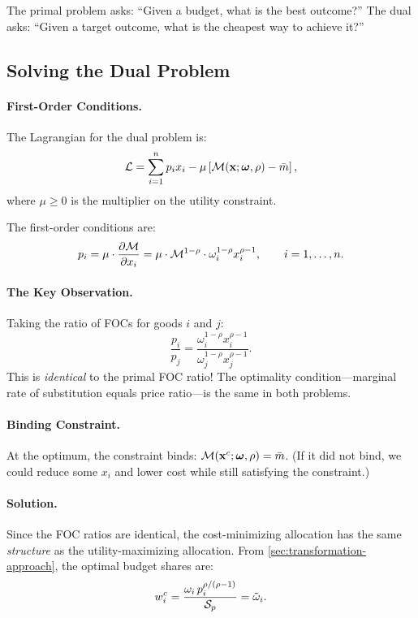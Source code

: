 The primal problem asks: ``Given a budget, what is the best outcome?'' The dual asks: ``Given a target outcome, what is the cheapest way to achieve it?''

\subsection{Solving the Dual Problem}
\label{subsec:dual-solution}

\paragraph{First-Order Conditions.}
The Lagrangian for the dual problem is:
\begin{equation}
\mathcal{L} = \sum_{i=1}^{n} p_i x_i - \mu \left[ \mathcal{M}(\mathbf{x}; \boldsymbol{\omega}, \rho) - \bar{m} \right],
\end{equation}
where $\mu \geq 0$ is the multiplier on the utility constraint.

The first-order conditions are:
\begin{equation}
\label{eq:dual-foc}
p_i = \mu \cdot \frac{\partial \mathcal{M}}{\partial x_i} = \mu \cdot \mathcal{M}^{1-\rho} \cdot \omega_i^{1-\rho} x_i^{\rho-1}, \qquad i = 1, \ldots, n.
\end{equation}

\paragraph{The Key Observation.}
Taking the ratio of FOCs for goods $i$ and $j$:
\begin{equation}
\frac{p_i}{p_j} = \frac{\omega_i^{1-\rho} x_i^{\rho-1}}{\omega_j^{1-\rho} x_j^{\rho-1}}.
\end{equation}
This is \emph{identical} to the primal FOC ratio! The optimality condition---marginal rate of substitution equals price ratio---is the same in both problems.

\paragraph{Binding Constraint.}
At the optimum, the constraint binds: $\mathcal{M}(\mathbf{x}^c; \boldsymbol{\omega}, \rho) = \bar{m}$. (If it did not bind, we could reduce some $x_i$ and lower cost while still satisfying the constraint.)

\paragraph{Solution.}
Since the FOC ratios are identical, the cost-minimizing allocation has the same \emph{structure} as the utility-maximizing allocation. From \cref{sec:transformation-approach}, the optimal budget shares are:
\begin{equation}
w_i^c = \frac{\omega_i \, p_i^{\rho/(\rho-1)}}{\mathcal{S}_p} = \tilde{\omega}_i.
\end{equation}

